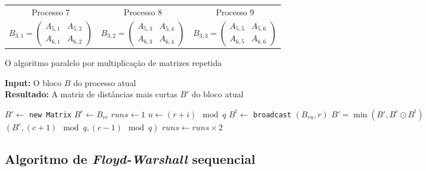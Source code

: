 \documentclass[10pt,a4paper,oneside]{article}
\begin{document}
\begin{table}[t]
\begin{tabular}{|c|c|c|}
    \hline
    Processo 7 & Processo 8 & Processo 9 \\
    $B_{3,1} = 
    \begin{pmatrix}
      A_{5,1} & A_{5,2} \\
      A_{6,1} & A_{6,2}
    \end{pmatrix}$ &
    $B_{3,2} = 
    \begin{pmatrix}
      A_{5,3} & A_{5,4} \\
      A_{6,3} & A_{6,4}
    \end{pmatrix}$ &
    $B_{3,3} = 
    \begin{pmatrix}
      A_{5,5} & A_{5,6} \\
      A_{6,5} & A_{6,6}
    \end{pmatrix}$ \\
    \hline
  \end{tabular}
\end{table}

\begin{algorithm}[b]
\small
\caption{O algoritmo paralelo por multiplicação de matrizes repetida}
\renewcommand{\arraystretch}{0.85}
\textbf{Input:} O bloco $B$ do processo atual\\
\textbf{Resultado:} A matriz de distâncias mais curtas $B'$ do bloco atual\\
\renewcommand{\arraystretch}{1.0}
\label{alg:alg1}
\begin{algorithmic}[1]
\State $B' \leftarrow $ {\tt new Matrix} 
\State $B^e \leftarrow B_{rc}$ 
\State $runs \leftarrow 1$
    \State $u \leftarrow (r + i) \mod q$
    \State $B^t \leftarrow$ {\tt broadcast} $(B_{ru}, r)$
    \State $B' = \min(B', B^e \odot B^t)$
     $(B^e, (c + 1) \mod q, (c - 1) \mod q)$
  \EndFor
  \State $runs \leftarrow runs \times 2$
\EndWhile
\end{algorithmic}
\end{algorithm}

\subsection{Algoritmo de \textit{Floyd-Warshall} sequencial}

\end{document}
